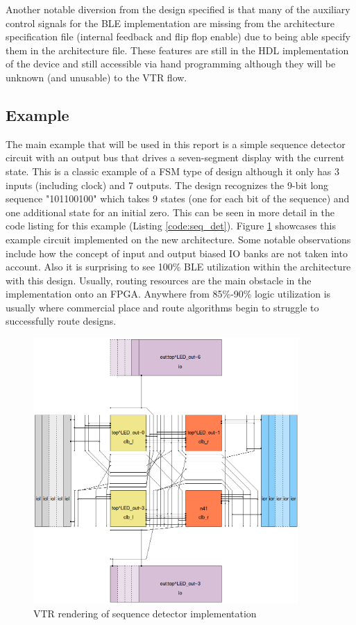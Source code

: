 \documentclass[12pt]{article}
\begin{document}
Another notable diversion from the design specified is that many of the auxiliary control 
signals for the BLE implementation are missing from the architecture specification file
(internal feedback and flip flop enable) due to being able specify them in the architecture file.
These features are still in the HDL implementation of the device and still accessible via hand
programming although they will be unknown (and unusable) to the VTR flow.

\subsection{Example} \label{vtr_ex}

The main example that will be used in this report is a simple sequence detector circuit
with an output bus that drives a seven-segment display with the current state. This is
a classic example of a FSM type of design although it only has 3 inputs (including clock)
and 7 outputs. The design recognizes the 9-bit long sequence "101100100" which takes
9 states (one for each bit of the sequence) and one additional state for an initial zero.
This can be seen in more detail in the code listing for this example (Listing \ref{code:seq_det}).
Figure \ref{fig:seq_det} showcases this example circuit implemented on the new architecture.
Some notable observations include how the concept of input and output biased IO banks
are not taken into account. Also it is surprising to see 100\% BLE utilization
within the architecture with this design. Usually, routing resources are the main
obstacle in the implementation onto an FPGA. Anywhere from 85\%-90\% logic utilization
is usually where commercial place and route algorithms begin to struggle to successfully
route designs.

\begin{figure}[H]
    \centering
    \includegraphics[width=0.9\textwidth]{seq_det}
    \caption{VTR rendering of sequence detector implementation}
    \label{fig:seq_det}
\end{figure}
\end{document}
